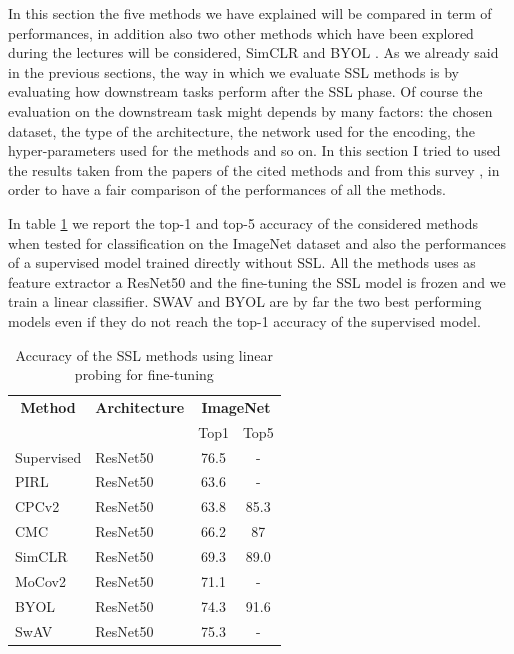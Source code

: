 In this section the five methods we have explained will be compared in term of performances, in addition also two other methods which have been explored during the lectures will be considered, SimCLR \cite{chen2020simple} and BYOL \cite{grill2020bootstrap}. As we already said in the previous sections, the way in which we evaluate SSL methods is by evaluating how downstream tasks perform after the SSL phase. Of course the evaluation on the downstream task might depends by many factors: the chosen dataset, the type of the architecture, the network used for the encoding, the hyper-parameters used for the methods and so on. In this section I tried to used the results taken from the papers of the cited methods and from this survey \cite{technologies9010002}, in order to have a fair comparison of the performances of all the methods.

In table \ref{tab:imagenet-top1-5-acc-comp} we report the top-1 and top-5 accuracy of the considered methods when tested for classification on the ImageNet dataset and also the performances of a supervised model trained directly without SSL. All the methods uses as feature extractor a ResNet50 and the fine-tuning the SSL model is frozen and we train a linear classifier. SWAV and BYOL are by far the two best performing models even if they do not reach the top-1 accuracy of the supervised model.

\begin{table}[H]
	\centering
	\begin{tabular}{|l|l|cc|}
		\hline
		\multicolumn{1}{|c|}{\textbf{Method}} & \textbf{Architecture} & \multicolumn{2}{c|}{\textbf{ImageNet}} \\
		\multicolumn{1}{|c|}{} &  & Top1 & Top5 \\
		\hline
		Supervised & ResNet50 & 76.5 & - \\
		\hline
		PIRL & ResNet50 & 63.6 & - \\
		CPCv2 & ResNet50 & 63.8 & 85.3 \\
		CMC & ResNet50  & 66.2 & 87 \\
		SimCLR & ResNet50 & 69.3 & 89.0 \\
		MoCov2 & ResNet50 & 71.1 & - \\
		BYOL & ResNet50  & 74.3 & 91.6 \\ 
		SwAV & ResNet50 & 75.3 & - \\
		\hline
\end{tabular}
	\caption{Accuracy of the SSL methods using linear probing for fine-tuning}
	\label{tab:imagenet-top1-5-acc-comp}
\end{table}


